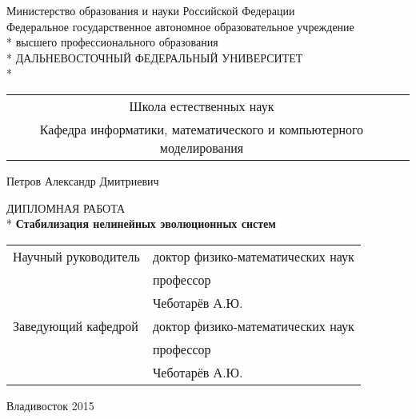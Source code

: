 \begin{titlepage}
\newpage

\begin{center}
Министерство образования и науки Российской Федерации \\
\vspace{1cm}
Федеральное государственное автономное образовательное учреждение \\*
высшего профессионального образования \\*
ДАЛЬНЕВОСТОЧНЫЙ  ФЕДЕРАЛЬНЫЙ  УНИВЕРСИТЕТ\\*
\hrulefill

\vspace{2em}

\begin{tabular}{cp{5cm}}
\hline
Школа естественных наук\\*
Кафедра информатики, математического и компьютерного моделирования\\*
\hline
\end{tabular}

\vspace{3em}

Петров Александр Дмитриевич

\vspace{6em}

\Large ДИПЛОМНАЯ РАБОТА\\*
\vspace{1em}
\Large \textbf{Стабилизация нелинейных эволюционных систем}

\end{center}

\vspace{4em}

\noindent\begin{tabular}{@{}p{}@{}>{\hfill}p{}@{}}

Научный руководитель&доктор физико-математических наук\\
&профессор\\[0.3cm]
&\underline{\hspace{3cm}} Чеботарёв А.Ю.\\[1.2cm]

Заведующий кафедрой&доктор физико-математических наук\\
&профессор\\[0.3cm]
&\underline{\hspace{3cm}} Чеботарёв А.Ю.
\end{tabular}

\vspace{\fill}

\begin{center}
Владивосток 2015
\end{center}

\end{titlepage}